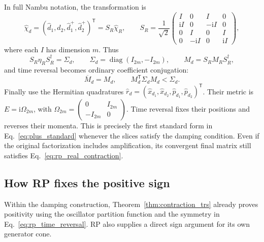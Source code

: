 \documentclass[11pt,a4paper]{article}
\newcommand{\diag}{\operatorname{diag}}
\newcommand{\ii}{\mathrm i}
\newcommand{\trans}{\mathsf T}
\numberwithin{equation}{section}
\begin{document}
In full Nambu notation, the transformation is
\begin{equation}
 \hat\chi_d=(\hat d_1,\hat d_2,\hat d_1^+,\hat d_2^+)^\trans
 =S_R\hat\chi_R,\qquad
 S_R=\frac1{\sqrt2}
 \begin{pmatrix}
 I&0&I&0\\
 \ii I&0&-\ii I&0\\
 0&I&0&I\\
 0&-\ii I&0&\ii I
 \end{pmatrix},
 \label{eq:rp_basis_matrix}
\end{equation}
where each $I$ has dimension $m$. Thus
\begin{equation}
 S_R\eta_R S_R^\dagger=\Sigma_d,\qquad
 \Sigma_d=\diag(I_{2m},-I_{2m}),\qquad
 M_d=S_RM_RS_R^\dagger,
 \label{eq:rp_metric_transform}
\end{equation}
and time reversal becomes ordinary coefficient conjugation:
\begin{equation}
 \overline M_d=M_d,\qquad M_d^\trans\Sigma_d M_d<\Sigma_d.
 \label{eq:rp_real_contraction}
\end{equation}
Finally use the Hermitian quadratures
$\hat r_d=(\hat x_{d_1},\hat x_{d_2},
\hat p_{d_1},\hat p_{d_2})^\trans$.
Their metric is $E=\ii\Omega_{2m}$, with
$\Omega_{2m}=\left(\begin{smallmatrix}0&I_{2m}\\-I_{2m}&0\end{smallmatrix}\right)$.
Time reversal fixes their positions and reverses their momenta.
This is precisely the first standard form in
Eq.~\eqref{eq:plus_standard} whenever the slices satisfy the damping
condition. Even if the original factorization includes amplification,
its convergent final matrix still satisfies
Eq.~\eqref{eq:rp_real_contraction}.

\subsection{How RP fixes the positive sign}

Within the damping construction, Theorem~\ref{thm:contraction_trs}
already proves positivity using the oscillator partition function and the symmetry
in Eq.~\eqref{eq:rp_time_reversal}. RP also supplies a direct sign
argument for its own generator cone.
\end{document}

